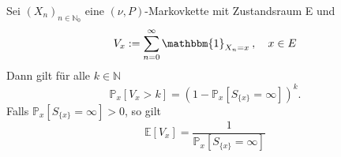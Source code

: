 \label{Anzahl Besuche}
Sei $(X_{n})_{n \in \mathbb{N}_{0}}$ eine $(\nu,P)$-Markovkette mit Zustandsraum E und 
\begin{equation*}
V_{x} := \sum_{n=0}^{\infty} \mathbbm{1}_{X_{n} = x} \: , \quad x \in E
\end{equation*}
Dann gilt für alle $k \in \mathbb{N}$ 
\begin{equation*}
\mathbb{P}_{x}[V_{x} > k] = (1-\mathbb{P}_{x}[S_{\lbrace x \rbrace} = \infty] )^{k}.
\end{equation*}
Falls $\mathbb{P}_{x}[S_{\lbrace x \rbrace} = \infty] > 0$, so gilt
\begin{equation*}
\mathbb{E}[V_{x}] = \dfrac{1}{\mathbb{P}_{x}[S_{\lbrace x \rbrace} = \infty]}
\end{equation*}